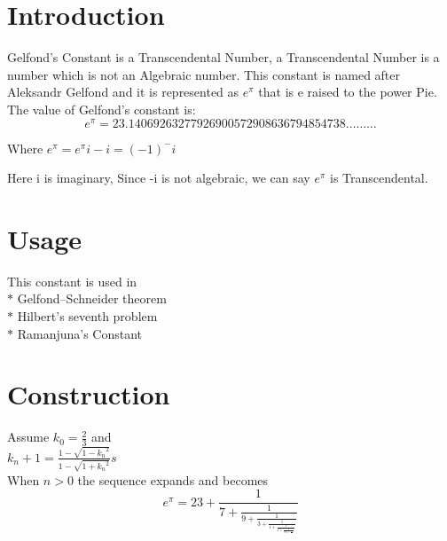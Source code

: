 \documentclass[12pt]{article}
\begin{document}
\listoffigures


    \maketitle
    
\section{Introduction\vspace{-2ex}}
Gelfond's Constant is a Transcendental Number,  a Transcendental Number is a number which is not an Algebraic number. This constant is named after Aleksandr Gelfond and it is represented as
$e^\pi$  that is e raised to the power Pie.\\

The value of Gelfond's constant is:
$$e^\pi  =23.14069263277926900572908636794854738………$$

Where     $e^\pi= {e^{\pi} i}-i= (-1)^-i$ \par

Here i is imaginary, Since -i is not algebraic, we can say $e^\pi$ is Transcendental.

\section*{Usage\vspace{-2ex}}
This constant is used in \\
    $* $ Gelfond–Schneider theorem\\
    $* $ Hilbert's seventh problem\\
    $* $ Ramanjuna’s Constant\\

\section*{Construction\vspace{-2ex}}
Assume   $\displaystyle{k_0=  \frac{2}{3}}$  and\\
$\displaystyle{k_n+1 = \frac{1-\sqrt{1-{k_n}^2}}{1-\sqrt{1+{k_n}^2}}}s$\\

When $n>0$ the sequence expands and becomes\\
{\Large$$e^\pi = 23 + \frac{1}{7 + \frac{1}{9 + \frac{1}{3 + \frac{1}{1 + \frac{1}{1 + \frac{1}{591 + \frac{1}{...}}}}}}}$$}
\end{document}
